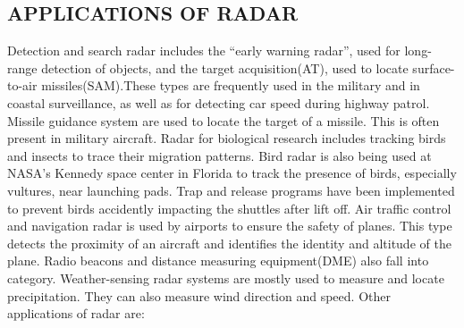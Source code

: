 \documentclass[14pt]{article} %
\begin{document}
\subsection{APPLICATIONS OF RADAR}
Detection and search radar includes the “early warning radar”, used for long-range detection of objects, and the target acquisition(AT), used to locate surface-to-air missiles(SAM).These types are frequently used in the military and in coastal surveillance, as well as for detecting car speed during highway patrol.
Missile guidance system are used to locate the target of a missile. This is often present in military aircraft.
Radar for biological research includes tracking birds and insects to trace their migration patterns. Bird radar is also being used at NASA’s Kennedy space center in Florida to track the presence of birds, especially vultures, near launching pads. Trap and release programs have been implemented to prevent birds accidently impacting the shuttles after lift off.
Air traffic control and navigation radar is used by airports to ensure the safety of planes. This type detects the proximity of an aircraft and identifies the identity and altitude of the plane. Radio beacons and distance measuring equipment(DME) also fall into category.
Weather-sensing radar systems are mostly used to measure and locate precipitation. They can also measure wind direction and speed. 
         Other applications of radar are:
\end{document}
